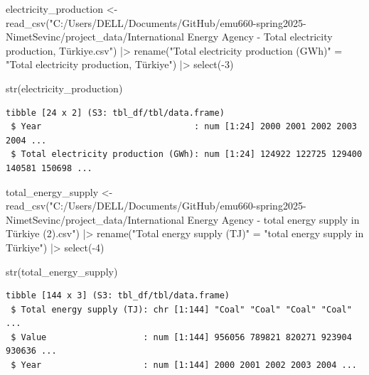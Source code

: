 \documentclass[
  letterpaper,
  DIV=11,
  numbers=noendperiod]{scrartcl}
\newenvironment{Shaded}{\begin{snugshade}}{\end{snugshade}}
\newcommand{\DecValTok}[1]{\textcolor[rgb]{0.68,0.00,0.00}{#1}}
\newcommand{\FunctionTok}[1]{\textcolor[rgb]{0.28,0.35,0.67}{#1}}
\newcommand{\NormalTok}[1]{\textcolor[rgb]{0.00,0.23,0.31}{#1}}
\newcommand{\OtherTok}[1]{\textcolor[rgb]{0.00,0.23,0.31}{#1}}
\newcommand{\SpecialCharTok}[1]{\textcolor[rgb]{0.37,0.37,0.37}{#1}}
\newcommand{\StringTok}[1]{\textcolor[rgb]{0.13,0.47,0.30}{#1}}
\begin{document}
\begin{Shaded}
\begin{Highlighting}[]
\NormalTok{electricity\_production }\OtherTok{\textless{}{-}} \FunctionTok{read\_csv}\NormalTok{(}\StringTok{"C:/Users/DELL/Documents/GitHub/emu660{-}spring2025{-}NimetSevinc/project\_data/International Energy Agency {-} Total electricity production, Türkiye.csv"}\NormalTok{) }\SpecialCharTok{|\textgreater{}} \FunctionTok{rename}\NormalTok{(}\StringTok{"Total electricity production (GWh)"} \OtherTok{=} \StringTok{"Total electricity production, Türkiye"}\NormalTok{) }\SpecialCharTok{|\textgreater{}} \FunctionTok{select}\NormalTok{(}\SpecialCharTok{{-}}\DecValTok{3}\NormalTok{)}

\FunctionTok{str}\NormalTok{(electricity\_production)}
\end{Highlighting}
\end{Shaded}

\begin{verbatim}
tibble [24 x 2] (S3: tbl_df/tbl/data.frame)
 $ Year                              : num [1:24] 2000 2001 2002 2003 2004 ...
 $ Total electricity production (GWh): num [1:24] 124922 122725 129400 140581 150698 ...
\end{verbatim}

\begin{Shaded}
\begin{Highlighting}[]
\NormalTok{total\_energy\_supply }\OtherTok{\textless{}{-}} \FunctionTok{read\_csv}\NormalTok{(}\StringTok{"C:/Users/DELL/Documents/GitHub/emu660{-}spring2025{-}NimetSevinc/project\_data/International Energy Agency {-} total energy supply in Türkiye (2).csv"}\NormalTok{) }\SpecialCharTok{|\textgreater{}} 
  \FunctionTok{rename}\NormalTok{(}\StringTok{"Total energy supply (TJ)"} \OtherTok{=} \StringTok{"total energy supply in Türkiye"}\NormalTok{) }\SpecialCharTok{|\textgreater{}} \FunctionTok{select}\NormalTok{(}\SpecialCharTok{{-}}\DecValTok{4}\NormalTok{)}


\FunctionTok{str}\NormalTok{(total\_energy\_supply)}
\end{Highlighting}
\end{Shaded}

\begin{verbatim}
tibble [144 x 3] (S3: tbl_df/tbl/data.frame)
 $ Total energy supply (TJ): chr [1:144] "Coal" "Coal" "Coal" "Coal" ...
 $ Value                   : num [1:144] 956056 789821 820271 923904 930636 ...
 $ Year                    : num [1:144] 2000 2001 2002 2003 2004 ...
\end{verbatim}
\end{document}

